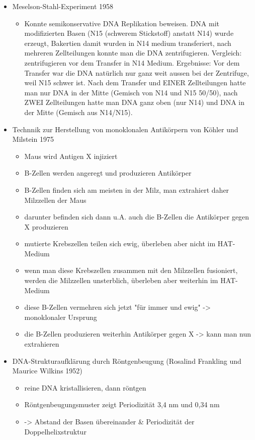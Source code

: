 \documentclass{article}
\begin{document}
\begin{itemize}
    \item Meselson-Stahl-Experiment 1958
        \begin{itemize}
            \item Konnte semikonservative DNA Replikation beweisen. DNA mit modifizierten Basen (N15 (schwerem Stickstoff) anstatt N14) wurde erzeugt, Bakertien damit wurden in N14 medium transferiert, nach mehreren Zellteilungen konnte man die DNA zentrifugieren. Vergleich: zentrifugieren vor dem Transfer in N14 Medium. Ergebnisse: Vor dem Transfer war die DNA natürlich nur ganz weit aussen bei der Zentrifuge, weil N15 schwer ist. Nach dem Transfer und EINER Zellteilungen hatte man nur DNA in der Mitte (Gemisch von N14 und N15 50/50), nach ZWEI Zellteilungen hatte man DNA ganz oben (nur N14) und DNA in der Mitte (Gemisch aus N14/N15).
        \end{itemize}                
        
    \item Technnik zur Herstellung von monoklonalen Antikörpern von Köhler und Milstein 1975
        \begin{itemize}
            \item Maus wird Antigen X injiziert
            \item B-Zellen werden angeregt und produzieren Antikörper
            \item B-Zellen finden sich am meisten in der Milz, man extrahiert daher Milzzellen der Maus
            \item darunter befinden sich dann u.A. auch die B-Zellen die Antikörper gegen X produzieren
            \item mutierte Krebszellen teilen sich ewig, überleben aber nicht im HAT-Medium
            \item wenn man diese Krebszellen zusammen mit den Milzzellen fusioniert, werden die Milzzellen unsterblich, überleben aber weiterhin im HAT-Medium
            \item diese B-Zellen vermehren sich jetzt "für immer und ewig" -> monoklonaler Ursprung
            \item die B-Zellen produzieren weiterhin Antikörper gegen X -> kann man nun extrahieren
        \end{itemize}        

    \item DNA-Strukturaufklärung durch Röntgenbeugung (Rosalind Frankling und Maurice Wilkins 1952)
        \begin{itemize}
            \item reine DNA kristallisieren, dann röntgen
            \item Röntgenbeugungsmuster zeigt Periodizität 3,4 nm und 0,34 nm
            \item -> Abstand der Basen übereinander & Periodizität der Doppelhelixstruktur
        \end{itemize}        


\end{itemize}
\end{document}
